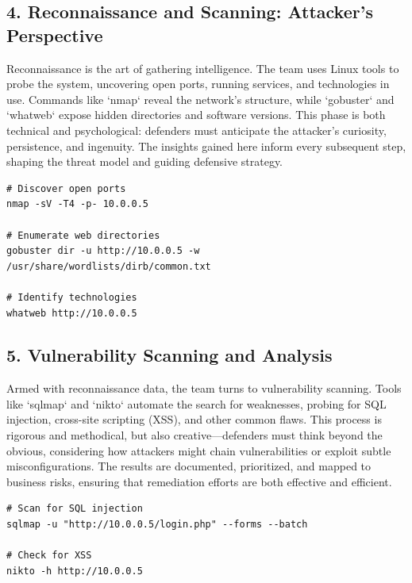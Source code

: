 \subsection*{4. Reconnaissance and Scanning: Attacker’s Perspective}
Reconnaissance is the art of gathering intelligence. The team uses Linux tools to probe the system, uncovering open ports, running services, and technologies in use\cite{shostack2014}. Commands like `nmap` reveal the network’s structure, while `gobuster` and `whatweb` expose hidden directories and software versions. This phase is both technical and psychological: defenders must anticipate the attacker’s curiosity, persistence, and ingenuity. The insights gained here inform every subsequent step, shaping the threat model and guiding defensive strategy.
\begin{verbatim}
# Discover open ports
nmap -sV -T4 -p- 10.0.0.5

# Enumerate web directories
gobuster dir -u http://10.0.0.5 -w /usr/share/wordlists/dirb/common.txt

# Identify technologies
whatweb http://10.0.0.5
\end{verbatim}

\subsection*{5. Vulnerability Scanning and Analysis}
Armed with reconnaissance data, the team turns to vulnerability scanning. Tools like `sqlmap` and `nikto` automate the search for weaknesses, probing for SQL injection, cross-site scripting (XSS), and other common flaws\cite{owasp}. This process is rigorous and methodical, but also creative—defenders must think beyond the obvious, considering how attackers might chain vulnerabilities or exploit subtle misconfigurations. The results are documented, prioritized, and mapped to business risks, ensuring that remediation efforts are both effective and efficient.
\begin{verbatim}
# Scan for SQL injection
sqlmap -u "http://10.0.0.5/login.php" --forms --batch

# Check for XSS
nikto -h http://10.0.0.5
\end{verbatim}

